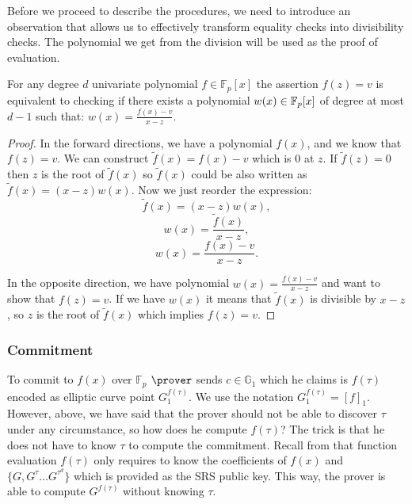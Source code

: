 Before we proceed to describe the procedures, we need to introduce an observation that allows us to effectively transform equality checks into divisibility checks. The polynomial we get from the division will be used as the proof of evaluation.  

\begin{lemma}
    \label{evaluation-proof}
    For any degree $d$ univariate polynomial $f \in \mathbb{F}_p[x]$ the assertion $f(z) = v$ is equivalent to checking if there exists a polynomial $w(x) \in \mathbb{F}_p[x]$ of degree at most $d - 1$ such that: $w(x) = \frac{f(x)-v}{x-z}$.
\end{lemma}

\begin{proof}
    In the forward directions, we have a polynomial $f(x)$, and we know that $f(z) = v$. We can construct $\widetilde{f}(x) = f(x) - v$ which is 0 at $z$. If $\widetilde{f}(z) = 0$ then $z$ is the root of $\widetilde{f}(x)$ so $\widetilde{f}(x)$ could be also written as $\widetilde{f}(x) = (x-z)w(x)$. Now we just reorder the expression:
    $$\widetilde{f}(x) = (x-z)w(x),$$
    $$w(x) = \frac{\widetilde{f}(x) }{x-z},$$
    $$w(x) = \frac{f(x) - v}{x-z}.$$

    In the opposite direction, we have polynomial $w(x) = \frac{f(x) - v}{x-z}$ and want to show that $f(z) = v$. If we have $w(x)$ it means that $\widetilde{f}(x)$ is divisible by $x-z$, so $z$ is the root of $\widetilde{f}(x)$ which implies $f(z) = v$. 
\end{proof}

\subsubsection{Commitment}
To commit to $f(x)$ over $\mathbb{F}_p$ $\prover$ sends $c \in \mathbb{G}_1$ which he claims is $f(\tau)$ encoded as elliptic curve point $G_1^{f(\tau)}$. We use the notation $G_1^{f(\tau)} = [f]_1$. However, above, we have said that the prover should not be able to discover $\tau$ under any circumstance, so how does he compute $f(\tau)$? The trick is that he does not have to know $\tau$ to compute the commitment. Recall from  that function evaluation $f(\tau)$ only requires to know the coefficients of $f(x)$ and $\{G, G^{\tau} \ldots G^{\tau^d}\}$ which is provided as the SRS public key. This way, the prover is able to compute $G^{f(\tau)}$ without knowing $\tau$.

